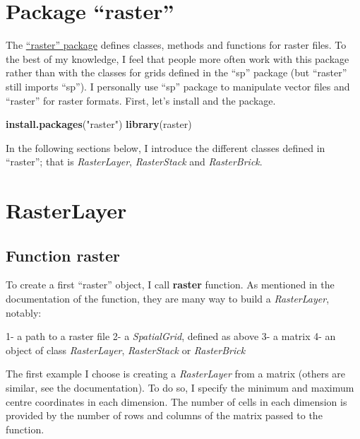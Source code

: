 \documentclass[]{report}
\newenvironment{Shaded}{\begin{snugshade}}{\end{snugshade}}
\newcommand{\KeywordTok}[1]{\textcolor[rgb]{0.13,0.29,0.53}{\textbf{#1}}}
\newcommand{\NormalTok}[1]{#1}
\newcommand{\StringTok}[1]{\textcolor[rgb]{0.31,0.60,0.02}{#1}}
\begin{document}
\hypertarget{package-raster}{%
\section{Package ``raster''}\label{package-raster}}

The
\href{http://cran.r-project.org/web/packages/raster/raster.pdf}{``raster''
package} defines classes, methods and functions for raster files. To the
best of my knowledge, I feel that people more often work with this
package rather than with the classes for grids defined in the ``sp''
package (but ``raster'' still imports ``sp''). I personally use ``sp''
package to manipulate vector files and ``raster'' for raster formats.
First, let's install and the package.

\begin{Shaded}
\begin{Highlighting}[]
\KeywordTok{install.packages}\NormalTok{(}\StringTok{"raster"}\NormalTok{)}
\KeywordTok{library}\NormalTok{(raster)}
\end{Highlighting}
\end{Shaded}

In the following sections below, I introduce the different classes
defined in ``raster''; that is \emph{RasterLayer}, \emph{RasterStack}
and \emph{RasterBrick}.

\hypertarget{rasterlayer}{%
\section{RasterLayer}\label{rasterlayer}}

\hypertarget{function-raster}{%
\subsection{\texorpdfstring{Function
\textbf{raster}}{Function raster}}\label{function-raster}}

To create a first ``raster'' object, I call \textbf{raster} function. As
mentioned in the documentation of the function, they are many way to
build a \emph{RasterLayer}, notably:

1- a path to a raster file 2- a \emph{SpatialGrid}, defined as above 3-
a matrix 4- an object of class \emph{RasterLayer}, \emph{RasterStack} or
\emph{RasterBrick}

The first example I choose is creating a \emph{RasterLayer} from a
matrix (others are similar, see the documentation). To do so, I specify
the minimum and maximum centre coordinates in each dimension. The number
of cells in each dimension is provided by the number of rows and columns
of the matrix passed to the function.
\end{document}
